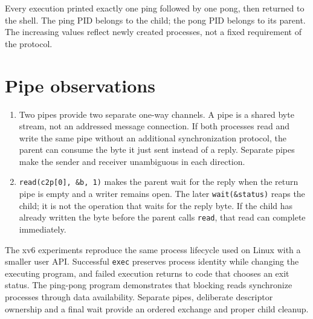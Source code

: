 \documentclass{../latex/utmreport}
\providecommand{\tightlist}{\setlength{\itemsep}{0pt}\setlength{\parskip}{0pt}}
\begin{document}
Every execution printed exactly one ping followed by one pong, then
returned to the shell. The ping PID belongs to the child; the pong PID
belongs to its parent. The increasing values reflect newly created
processes, not a fixed requirement of the protocol.

\newpage
\section{Pipe observations}\label{pipe-observations}

\begin{enumerate}
\def\labelenumi{\arabic{enumi}.}
\tightlist
\item
  Two pipes provide two separate one-way channels. A pipe is a shared
  byte stream, not an addressed message connection. If both processes
  read and write the same pipe without an additional synchronization
  protocol, the parent can consume the byte it just sent instead of a
  reply. Separate pipes make the sender and receiver unambiguous in each
  direction.
\item
  \texttt{read(c2p{[}0{]},\ \&b,\ 1)} makes the parent wait for the
  reply when the return pipe is empty and a writer remains open. The
  later \texttt{wait(\&status)} reaps the child; it is not the operation
  that waits for the reply byte. If the child has already written the
  byte before the parent calls \texttt{read}, that read can complete
  immediately.
\end{enumerate}

\utmconclusions

The xv6 experiments reproduce the same process lifecycle used on Linux
with a smaller user API. Successful \texttt{exec} preserves process
identity while changing the executing program, and failed execution
returns to code that chooses an exit status. The ping-pong program
demonstrates that blocking reads synchronize processes through data
availability. Separate pipes, deliberate descriptor ownership and a
final wait provide an ordered exchange and proper child cleanup.
\end{document}

